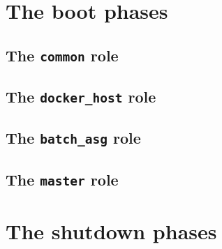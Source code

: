 	\section{The boot phases}
		\subsection{The \texttt{common} role}
		\subsection{The \texttt{docker\_host} role}
		\subsection{The \texttt{batch\_asg} role}
		\subsection{The \texttt{master} role}
	\section{The shutdown phases}